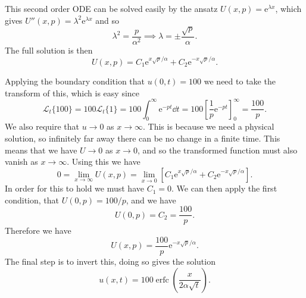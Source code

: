 \documentclass[fleqn]{NotesClass}
\newcommand*{\e}{\mathrm{e}}
\DeclareMathOperator{\erfc}{erfc}
\newcommand*{\laplaceTransform}{\mathcal{L}}
\begin{document}
    This second order ODE can be solved easily by the ansatz \(U(x, p) = \e^{\lambda x}\), which gives \(U''(x, p) = \lambda^2\e^{\lambda x}\) and so
    \begin{equation}
        \lambda^2 = \frac{p}{\alpha^2} \implies \lambda = \pm \frac{\sqrt{p}}{\alpha}.
    \end{equation}
    The full solution is then
    \begin{equation}
        U(x, p) = C_1 \e^{x\sqrt{p}/\alpha} + C_2 \e^{-x\sqrt{p}/\alpha}.
    \end{equation}
    
    Applying the boundary condition that \(u(0, t) = 100\) we need to take the transform of this, which is easy since
    \begin{equation}
        \laplaceTransform_{t}\{100\} = 100 \laplaceTransform_{t}\{1\} = 100 \int_{0}^{\infty} \e^{-pt} \dd{t} = 100\left[ \frac{1}{p}\e^{-pt} \right]_{0}^{\infty} = \frac{100}{p}.
    \end{equation}
    We also require that \(u \to 0\) as \(x \to \infty\).
    This is because we need a physical solution, so infinitely far away there can be no change in a finite time.
    This means that we have \(U \to 0\) as \(x \to 0\), and so the transformed function must also vanish as \(x \to \infty\).
    Using this we have
    \begin{equation}
        0 = \lim_{x\to\infty} U(x, p) = \lim_{x\to 0}\left[ C_1\e^{x\sqrt{p}/\alpha} + C_2\e^{-x\sqrt{p}/\alpha} \right].
    \end{equation}
    In order for this to hold we must have \(C_1 = 0\).
    We can then apply the first condition, that \(U(0, p) = 100/p\), and we have
    \begin{equation}
        U(0, p) = C_2 = \frac{100}{p}.
    \end{equation}
    Therefore we have
    \begin{equation}
        U(x, p) = \frac{100}{p}\e^{-x\sqrt{p}/\alpha}.
    \end{equation}
    The final step is to invert this, doing so gives the solution
    \begin{equation}
        u(x, t) = 100\erfc\left( \frac{x}{2\alpha\sqrt{t}} \right).
    \end{equation}
    
\end{document}
